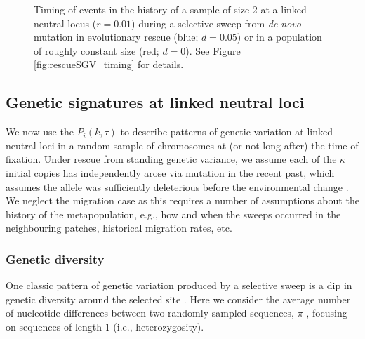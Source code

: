 \documentclass[]{article}
\begin{document}
\begin{figure}[htbp]
\caption{
Timing of events in the history of a sample of size 2 at a linked neutral locus ($r=0.01$) during a selective sweep from \textit{de novo} mutation in evolutionary rescue (blue; $d=0.05$) or in a population of roughly constant size (red; $d=0$).
See Figure \ref{fig:rescueSGV_timing} for details.
}%
\label{fig:rescueDNM_timing}
\end{figure}

\subsection*{Genetic signatures at linked neutral loci}
\label{sec:rescue_signatures}

We now use the $P_i(k,\tau)$ to describe patterns of genetic variation at linked neutral loci in a random sample of chromosomes at (or not long after) the time of fixation.
Under rescue from standing genetic variance, we assume each of the $\kappa$ initial copies has independently arose via mutation in the recent past, which assumes the allele was sufficiently deleterious before the environmental change \citep[c.f.,][]{prezeworski2005signature}.
We neglect the migration case as this requires a number of assumptions about the history of the metapopulation, e.g., how and when the sweeps occurred in the neighbouring patches, historical migration rates, etc.

\subsubsection*{Genetic diversity}
\label{sec:rescue_heterozygosity}

One classic pattern of genetic variation produced by a selective sweep is a dip in genetic diversity around the selected site \citep{smith1974hitch,kaplan1989hitchhiking}. 
Here we consider the average number of nucleotide differences between two randomly sampled sequences, $\pi$ \citep{tajima1983evolutionary}, focusing on sequences of length 1 (i.e., heterozygosity).
\end{document}
